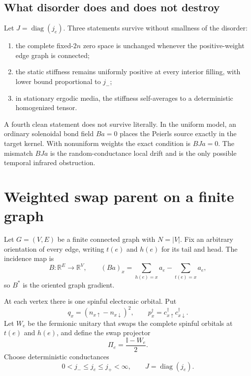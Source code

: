 \documentclass[11pt]{article}
\theoremstyle{definition}
\theoremstyle{remark}
\newcommand{\Id}{\mathbb I}
\newcommand{\R}{\mathbb R}
\newcommand{\diag}{\operatorname{diag}}
\newcommand{\abs}[1]{\left\lvert #1\right\rvert}
\begin{document}
\subsection{What disorder does and does not destroy}

Let $J=\diag(j_e)$.  Three statements survive without smallness of the disorder:
\begin{enumerate}[leftmargin=2.2em,itemsep=0.2em]
 \item the complete fixed-$2n$ zero space is unchanged whenever the positive-weight edge graph is connected;
 \item the static stiffness remains uniformly positive at every interior filling, with lower bound proportional to $j_-$;
 \item in stationary ergodic media, the stiffness self-averages to a deterministic homogenized tensor.
\end{enumerate}
A fourth clean statement does not survive literally.  In the uniform model, an ordinary solenoidal bond field $Ba=0$ places the Peierls source exactly in the target kernel.  With nonuniform weights the exact condition is $BJa=0$.  The mismatch $BJa$ is the random-conductance local drift and is the only possible temporal infrared obstruction.

\section{Weighted swap parent on a finite graph}
\label{sec:model}

Let $G=(V,E)$ be a finite connected graph with $N=\abs V$.  Fix an arbitrary orientation of every edge, writing $t(e)$ and $h(e)$ for its tail and head.  The incidence map is
\begin{equation}
 B:\R^E\longrightarrow\R^V,
 \qquad
 (Ba)_x=\sum_{h(e)=x}a_e-\sum_{t(e)=x}a_e,
 \label{eq:incidence}
\end{equation}
so $B^*$ is the oriented graph gradient.

At each vertex there is one spinful electronic orbital.  Put
\begin{equation}
 q_x=(n_{x\uparrow}-n_{x\downarrow})^2,
 \qquad
 p_x^\dagger=c_{x\uparrow}^\dagger c_{x\downarrow}^\dagger.
\end{equation}
Let $W_e$ be the fermionic unitary that swaps the complete spinful orbitals at $t(e)$ and $h(e)$, and define the swap projector
\begin{equation}
 \Pi_e=\frac{\Id-W_e}{2}.
\end{equation}
Choose deterministic conductances
\begin{equation}
 0<j_-\le j_e\le j_+<\infty,
 \qquad J=\diag(j_e).
 \label{eq:ellipticity}
\end{equation}
\end{document}
